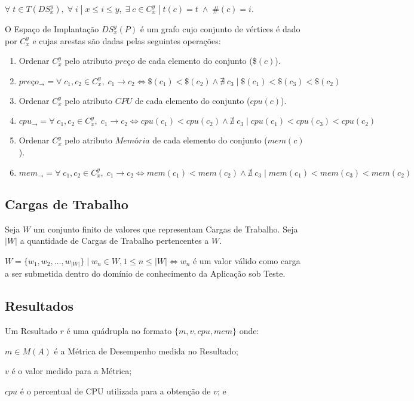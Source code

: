 $\forall \; t \in T(DS_x^y), \; \forall \; i \; | \; x \leq i \leq y, \; \exists \; c \in C_x^y \; | \; t(c) = t \; \land \; \#(c) = i$.
 
O Espaço de Implantação $DS_x^y(P)$ é um grafo cujo conjunto de vértices é dado 
por $C_x^y$ e cujas arestas são dadas pelas seguintes operações:

\begin{enumerate}
  \item Ordenar $C_x^y$ pelo atributo $preço$ de cada elemento do conjunto (\$$(c)$).
  \item $preço_{\to} = \forall\; c_1, c_2 \in C_x^y,\; c_1 \to c_2 \iff \$(c_1) < \$(c_2) \land \nexists\; c_3\;|\; \$(c_1) < \$(c_3) < \$(c_2)$
  \item Ordenar $C_x^y$ pelo atributo $CPU$ de cada elemento do conjunto ($cpu(c)$).
  \item $cpu_{\to} = \forall\; c_1, c_2 \in C_x^y,\; c_1 \to c_2 \iff cpu(c_1) < cpu(c_2) \land \nexists\; c_3\;|\; cpu(c_1) < cpu(c_3) < cpu(c_2)$
  \item Ordenar $C_x^y$ pelo atributo $Memória$ de cada elemento do conjunto ($mem(c)$).
  \item $mem_{\to} = \forall\; c_1, c_2 \in C_x^y,\; c_1 \to c_2 \iff mem(c_1) < mem(c_2) \land \nexists\; c_3\;|\; mem(c_1) < mem(c_3) < mem(c_2)$
\end{enumerate}

\subsection{Cargas de Trabalho}
Seja $W$ um conjunto finito de valores que representam Cargas de Trabalho. Seja 
$|W|$ a quantidade de Cargas de Trabalho pertencentes a $W$.

$W = \{w_1, w_2, \dotsc, w_{|W|}\}\; | \; w_n \in W, 1 \leq n \leq |W| \iff w_n $ 
é um valor válido como carga a ser submetida dentro do domínio de conhecimento 
da Aplicação sob Teste.

\subsection{Resultados}
\label{subsec:formalizacao_resultados}
Um Resultado $r$ é uma quádrupla no formato $\{m, v, cpu, mem\}$ onde:

$m \in M(A)$ é a Métrica de Desempenho medida no Resultado;

$v$ é o valor medido para a Métrica;

$cpu$ é o percentual de CPU utilizada para a obtenção de $v$; e

